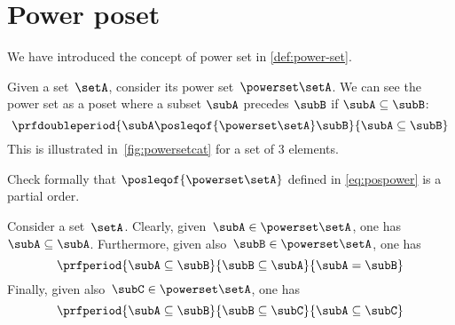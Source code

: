 \section{Power poset}

We have introduced the concept of power set in \cref{def:power-set}.

\begin{definition}
    \label{ex:hasseinclusion}
    Given a set~$\setA$, consider its power set~$\powerset\setA$.
    We can see the power set as a poset where a subset $\subA$ precedes $\subB$ if $\subA \subseteq \subB$:
    \begin{equation}\label{eq:pospower}
        \prfdoubleperiod{
            \subA \posleqof{\powerset\setA} \subB
        }{
            \subA \subseteq \subB
        }
    \end{equation}
    This is illustrated in~\cref{fig:powersetcat} for a set of 3 elements.
\end{definition}
\begin{exercise}
    Check formally that $\posleqof{\powerset\setA}$ defined in \cref{eq:pospower} is a partial order.
\end{exercise}
\begin{solution}
    Consider a set~$\setA$.
    Clearly, given~$\subA\in \powerset \setA$, one has~$\subA\subseteq \subA$.
    Furthermore, given also~$\subB\in \powerset \setA$, one has
    \begin{equation*}
        \prfperiod{\subA\subseteq \subB}{\subB\subseteq \subA}{\subA=\subB}
    \end{equation*}
    Finally, given also~$\subC\in \powerset \setA$, one has
    \begin{equation*}
        \prfperiod{\subA\subseteq \subB}{\subB\subseteq \subC}{\subA\subseteq\subC}
    \end{equation*}
\end{solution}

\begin{figure*}[h]
    \centering
    \caption{Power set as a poset.
    }
    \label{fig:powersetcat}
\end{figure*}

